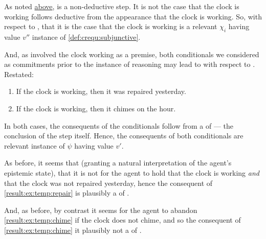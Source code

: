 \begin{note}
  As noted \hyperref[step-a-non-deductive]{above}, \CStepA{} is a non-deductive step.
  It is not the case that the clock is working follows deductive from the appearance that the clock is working.
  So, with respect to \CStepA{}, that it is the case that the clock is working is a relevant \(\chi_{i}\) having value \(v''\) instance of \ref{def:crequ:subjunctive}.

  And, as \CStepB{} involved the clock working as a premise, both conditionals we considered as commitments prior to the instance of reasoning may lead to  with respect to \CStepA{}.
  Restated:

  \begin{enumerate}[label=A\(^{+}\)\arabic*., ref=(A\(^{+}\)\arabic*)]
  \item
    \label{result:ex:temp:repair}
    If the clock is working, then it was repaired yesterday.
  \item
    \label{result:ex:temp:chime}
    If the clock is working, then it chimes on the hour.
  \end{enumerate}

  In both cases, the consequents of the conditionals follow from a \crequ{} of \CStepA{} --- the conclusion of the step itself.
  Hence, the consequents of both conditionals are relevant instance of \(\psi\) having value \(v'\).

  As before, it seems that (granting a natural interpretation of the agent's epistemic state), that it is not \epVAd{} for the agent to hold that the clock is working \emph{and} that the clock was not repaired yesterday, hence the consequent of \ref{result:ex:temp:repair} is plausibly a \cprequ{} of \CStepA{}.

  And, as before, by contrast it seems \epVAd{} for the agent to abandon \ref{result:ex:temp:chime} if the clock does not chime, and so the consequent of \ref{result:ex:temp:chime} it plausibly not a \cprequ{} of \CStepA{}.
\end{note}

\hozline

